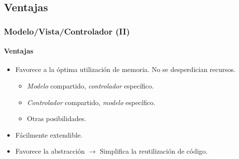 \documentclass[12pt]{beamer}
\begin{document}
\subsection{Ventajas}
\begin{frame}
  \frametitle{Modelo/Vista/Controlador (II)}
  \framesubtitle{Ventajas}

  \begin{block}{}
    \begin{itemize}
      \item Favorece a la óptima utilización de memoria. No se desperdician recursos.
        \begin{itemize}
          \item \emph{Modelo} compartido, \emph{controlador} específico.
          \medskip
          \pause
          \item \emph{Controlador} compartido, \emph{modelo} específico.
          \medskip
          \pause
          \item Otras posibilidades.
        \end{itemize}
      \medskip
      \pause
      \item Fácilmente extendible.
      \medskip
      \pause
      \item Favorece la abstracción \textcolor{oxygenorange}{$\rightarrow$} Simplifica la reutilización de código.
    \end{itemize}
  \end{block}

\end{frame}
\end{document}
